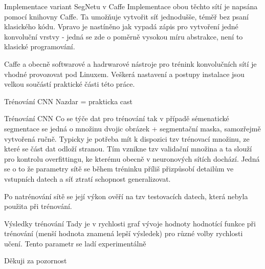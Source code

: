 \documentclass[aspectratio=1610]{beamer}
\begin{document}
\begin{frame}{Implementace variant SegNetu v Caffe}	
Implementace obou těchto sítí je napsána pomocí knihovny Caffe. Ta umožňuje vytvořit síť jednodušše, téměř bez psaní klasického kódu. Vpravo je nastíněno jak vypadá zápis pro vytvoření jedné konvoluční vrstvy - jedná se zde o poměrně vysokou míru abstrakce, není to klasické programování. 

Caffe a obecně softwarové a hadrwarové nástroje pro trénink konvolučních sítí je vhodné provozovat pod Linuxem. Veškerá nastavení a postupy instalace jsou velkou součástí praktické části této práce.
\end{frame}
\begin{frame}{Trénování CNN}
Nazdar = prakticka cast
\end{frame}
\begin{frame}{Trénování CNN}
Co se týče dat pro trénování tak v případě sémenatické segmentace se jedná o množinu dvojic obrázek + segmentační maska, samozřejmě vytvořená ručně. Typicky je potřeba mít k dispozici tzv trénovací množinu, ze které se část dat odloží stranou. Tím vznikne tzv validační množina a ta slouží pro kontrolu overfittingu, ke kterému obecně v neuronových sítích dochází. Jedná se o to že parametry sítě se během tréninku příliš přizpůsobí detailům ve vstupních datech a síť ztratí schopnost generalizovat. 

Po natrénování sítě se její výkon ověří na tzv testovacích datech, která nebyla použita při trénování.  
\end{frame}
\begin{frame}{Výsledky trénování}
Tady je v rychlosti graf vývoje hodnoty hodnotící funkce při trénování (menší hodnota znamená lepší výsledek) pro různé volby rychlosti učení. Tento parametr se ladí experimentálně
\end{frame}
\begin{frame}{}
	\centering
	{\Large Děkuji za pozornost}	
\end{frame}
\end{document}
